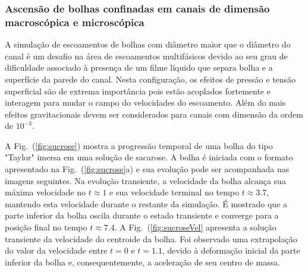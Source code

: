 \documentclass[a4paper,portuges,12pt]{article}
\begin{document}
\subsubsection{Ascensão de bolhas confinadas em canais de dimensão
macroscópica e microscópica}

A simulação de escoamentos de bolhas com diâmetro maior que o diâmetro
do canal é um desafio na área de escoamentos multifásicos devido ao seu
grau de dificuldade associado à presença de um filme líquido que separa
bolha e a superfície da parede do canal. Nesta configuração, os efeitos
de pressão e tensão superficial são de extrema importância pois estão
acoplados fortemente e interagem para mudar o campo do velocidades do
escoamento. Além do mais efeitos gravitacionais devem ser considerados
para canais com dimensão da ordem de $10^{-3}$.

A Fig.~(\ref{fig:sucrose}) mostra a progressão temporal de uma bolha do
tipo "Taylor" imersa em uma solução de sacarose. A bolha é iniciada com
o formato apresentado na Fig.~(\ref{fig:sucrose}a) e sua evolução pode
ser acompanhada nas imagens seguintes. Na evolução transiente, a
velocidade da bolha alcança sua máxima velocidade no $t \approx 1$ e sua
velocidade terminal no tempo $t \approx 3.7$, mantendo esta velocidade
durante o restante da simulação. É mostrado que a parte inferior da
bolha oscila durante o estado transiente e converge para a posição final
no tempo $t \approx 7.4$. A Fig.~(\ref{fig:sucroseVel} apresenta a
solução transiente da velocidade do centroide da bolha. Foi observado
uma extrapolação do valor da velocidade entre $t=0$ e $t=1.1$, devido à
deformação inicial da parte inferior da bolha e, consequentemente, a
aceleração de seu centro de massa.
\end{document}
